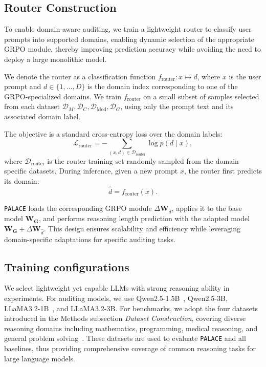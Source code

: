 \documentclass[pdflatex,sn-mathphys-num]{sn-jnl}%
\newcommand{\n}{\texttt{PALACE}\xspace}
\theoremstyle{thmstyleone}%
\theoremstyle{thmstyletwo}%
\theoremstyle{thmstylethree}%
\begin{document}
\subsection{Router Construction}

To enable domain-aware auditing, we train a lightweight router to classify user prompts into supported domains, enabling dynamic selection of the appropriate GRPO module, thereby improving prediction accuracy while avoiding the need to deploy a large monolithic model.

We denote the router as a classification function \( f_{\text{router}}: x \mapsto d \), where \(x\) is the user prompt and \(d \in \{1, \dots, D\}\) is the domain index corresponding to one of the GRPO-specialized domains. We train \(f_{\text{router}}\) on a small subset of samples selected from each dataset \(\mathcal{D}_M, \mathcal{D}_C, \mathcal{D}_{\text{Med}}, \mathcal{D}_G\), using only the prompt text and its associated domain label.

The objective is a standard cross-entropy loss over the domain labels:
\begin{equation}
\mathcal{L}_{\text{router}} = - \sum_{(x, d) \in \mathcal{D}_{\text{router}}} \log p(d \mid x),
\end{equation}
where \(\mathcal{D}_{\text{router}}\) is the router training set randomly sampled from the domain-specific datasets.
During inference, given a new prompt \(x\), the router first predicts its domain:
\begin{equation}
\hat{d} = f_{\text{router}}(x).
\end{equation}

{\n} loads the corresponding GRPO module \(\Delta \mathbf{W}_{\hat{d}}\), applies it to the base model \(\mathbf{W_G}\), and performs reasoning length prediction with the adapted model \(\mathbf{W_G} + \Delta \mathbf{W}_{\hat{d}}\).
This design ensures scalability and efficiency while leveraging domain-specific adaptations for specific auditing tasks.

\subsection{Training configurations}

We select lightweight yet capable LLMs with strong reasoning ability in experiments. For auditing models, we use Qwen2.5-1.5B~\citep{qwen2.5}, Qwen2.5-3B, LLaMA3.2-1B~\citep{dubey2024llama}, and LLaMA3.2-3B. For benchmarks, we adopt the four datasets introduced in the Methods subsection \emph{Dataset Construction}, covering diverse reasoning domains including mathematics, programming, medical reasoning, and general problem solving~\citep{openr1}. These datasets are used to evaluate {\n} and all baselines, thus providing comprehensive coverage of common reasoning tasks for large language models.
\end{document}

